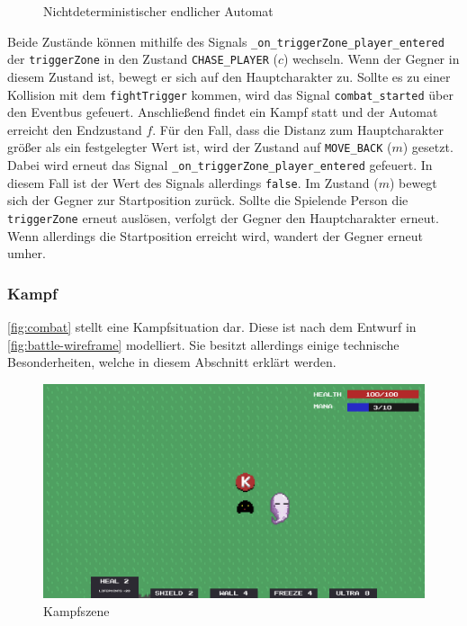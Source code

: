 \begin{figure}[H]
\centering
{}
\caption{Nichtdeterministischer endlicher Automat}
\label{fig:fsm}
\end{figure}

Beide Zustände können mithilfe des Signals \texttt{\_on\_triggerZone\_player\_entered} der \texttt{triggerZone} in den Zustand \texttt{CHASE\_PLAYER} ($c$) wechseln. Wenn der Gegner in diesem Zustand ist, bewegt er sich auf den Hauptcharakter zu. Sollte es zu einer Kollision mit dem \texttt{fightTrigger} kommen, wird das Signal \texttt{combat\_started} über den Eventbus gefeuert. Anschließend findet ein Kampf statt und der Automat erreicht den Endzustand $f$. Für den Fall, dass die Distanz zum Hauptcharakter größer als ein festgelegter Wert ist, wird der Zustand auf \texttt{MOVE\_BACK} ($m$) gesetzt. Dabei wird erneut das Signal \texttt{\_on\_triggerZone\_player\_entered} gefeuert. In diesem Fall ist der Wert des Signals allerdings \texttt{false}. Im Zustand ($m$) bewegt sich der Gegner zur Startposition zurück. Sollte die Spielende Person die \texttt{triggerZone} erneut auslösen, verfolgt der Gegner den Hauptcharakter erneut. Wenn allerdings die Startposition erreicht wird, wandert der Gegner erneut umher.\\

\subsubsection{Kampf}
\autoref{fig:combat} stellt eine Kampfsituation dar. Diese ist nach dem Entwurf in \autoref{fig:battle-wireframe} modelliert. Sie besitzt allerdings einige technische Besonderheiten, welche in diesem Abschnitt erklärt werden.

\begin{figure}[H]
\centering
\includegraphics[width=0.8\columnwidth]{figures/screenshots/combat.png}
\caption{\label{fig:combat}Kampfszene}
\end{figure}

